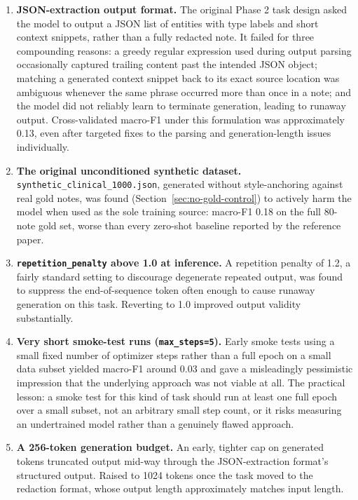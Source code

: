 \documentclass[12pt,a4paper]{report}
\begin{document}
\begin{enumerate}[nosep]
  \item \textbf{JSON-extraction output format.} The original Phase 2 task design asked the model to output a JSON list of entities with type labels and short context snippets, rather than a fully redacted note. It failed for three compounding reasons: a greedy regular expression used during output parsing occasionally captured trailing content past the intended JSON object; matching a generated context snippet back to its exact source location was ambiguous whenever the same phrase occurred more than once in a note; and the model did not reliably learn to terminate generation, leading to runaway output. Cross-validated macro-F1 under this formulation was approximately 0.13, even after targeted fixes to the parsing and generation-length issues individually.
  \item \textbf{The original unconditioned synthetic dataset.} \texttt{synthetic\_clinical\_1000.json}, generated without style-anchoring against real gold notes, was found (Section~\ref{sec:no-gold-control}) to actively harm the model when used as the sole training source: macro-F1 0.18 on the full 80-note gold set, worse than every zero-shot baseline reported by the reference paper.
  \item \textbf{\texttt{repetition\_penalty} above 1.0 at inference.} A repetition penalty of 1.2, a fairly standard setting to discourage degenerate repeated output, was found to suppress the end-of-sequence token often enough to cause runaway generation on this task. Reverting to 1.0 improved output validity substantially.
  \item \textbf{Very short smoke-test runs (\texttt{max\_steps=5}).} Early smoke tests using a small fixed number of optimizer steps rather than a full epoch on a small data subset yielded macro-F1 around 0.03 and gave a misleadingly pessimistic impression that the underlying approach was not viable at all. The practical lesson: a smoke test for this kind of task should run at least one full epoch over a small subset, not an arbitrary small step count, or it risks measuring an undertrained model rather than a genuinely flawed approach.
  \item \textbf{A 256-token generation budget.} An early, tighter cap on generated tokens truncated output mid-way through the JSON-extraction format's structured output. Raised to 1024 tokens once the task moved to the redaction format, whose output length approximately matches input length.
\end{enumerate}
\end{document}
